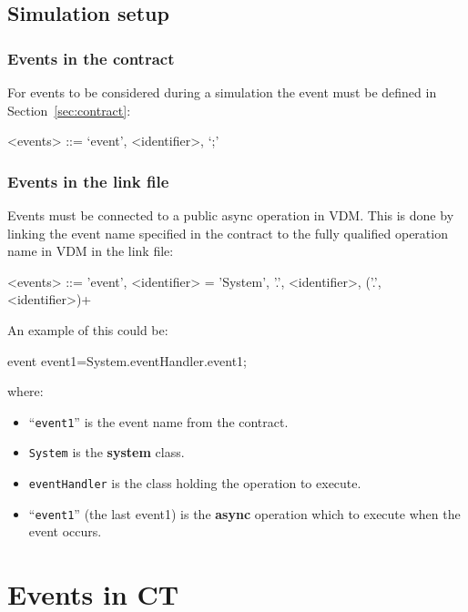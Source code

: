 \documentclass{crescendorepchap}
\newcommand{\vdmkeyw}[1]{{\bf\ttfamily #1}}
\begin{document}
\subsection{Simulation setup}

\subsubsection{Events in the contract}

For events to be considered during a simulation the event must be
defined in Section~\ref{sec:contract}:

\begin{grammar}
<events> ::= `event', <identifier>, `;'
\end{grammar}

\subsubsection{Events in the link file}

Events must be connected to a public async operation in VDM. This is
done by linking the event name specified in the contract to the fully
qualified operation name in VDM in the link file:

\begin{grammar}
<events> ::= 'event', <identifier> = 'System', '.', <identifier>, ('.', <identifier>)+
\end{grammar}

\noindent An example of this could be:

\begin{dcl}
event event1=System.eventHandler.event1;
\end{dcl}

\noindent where:

\begin{itemize}
\item
  ``\texttt{event1}'' is the event name from the contract.
\item
  \texttt{System} is the \vdmkeyw{system} class.
\item
  \texttt{eventHandler} is the class holding the operation to execute.
\item
  ``\texttt{event1}'' (the last event1) is the \vdmkeyw{async} operation which to execute
  when the event occurs.
\end{itemize}

\section{Events in CT}
\end{document}
